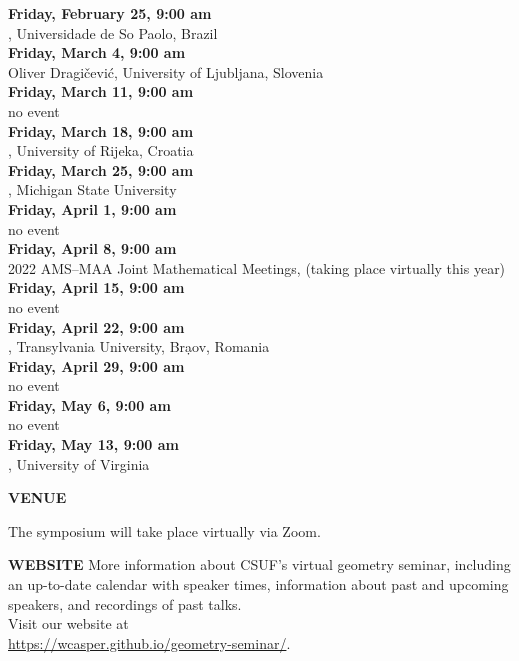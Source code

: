 \documentclass[a4paper]{article}
\begin{document}
\begin{minipage}{0.95\textwidth}
\begin{minipage}[b]{0.47\textwidth}
{\leavevmode \raggedright
\textbf{\color{cprimary}Friday, February 25, 9:00 am}\\ , Universidade de So Paolo, Brazil\\
\textbf{\color{cprimary} Friday, March 4, 9:00 am}\\ Oliver Dragi\v{c}evi\'{c}, University of Ljubljana, Slovenia\\
\textbf{\color{cprimary} Friday, March 11, 9:00 am}\\ no event\\
\textbf{\color{cprimary} Friday, March 18, 9:00 am}\\ , University of Rijeka, Croatia\\
\textbf{\color{cprimary} Friday, March 25, 9:00 am}\\ , Michigan State University\\
\textbf{\color{cprimary} Friday, April 1, 9:00 am}\\ no event\\
\textbf{\color{cprimary} Friday, April 8, 9:00 am}\\ 2022 AMS--MAA Joint Mathematical Meetings, (taking place virtually this year)\\
\textbf{\color{cprimary} Friday, April 15, 9:00 am}\\ no event\\
\textbf{\color{cprimary} Friday, April 22, 9:00 am}\\ , Transylvania University, Br\d{a}ov, Romania\\
\textbf{\color{cprimary} Friday, April 29, 9:00 am}\\ no event\\
\textbf{\color{cprimary} Friday, May 6, 9:00 am}\\ no event\\
\textbf{\color{cprimary} Friday, May 13, 9:00 am}\\ , University of Virginia\\
\par{}
}

\vspace{0.5in}
\medskip

\large{\color{csecondary}\textbf{VENUE}}

The symposium will take place virtually via Zoom.

\medskip

\large{\color{csecondary}\textbf{WEBSITE}}
More information about CSUF's virtual geometry seminar, including an up-to-date calendar with speaker times, information about past and upcoming speakers, and recordings of past talks.\\
Visit our website at\\ \href{https://wcasper.github.io/geometry-seminar/}{https://wcasper.github.io/geometry-seminar/}.


\end{minipage}
\end{minipage}
\end{document}
